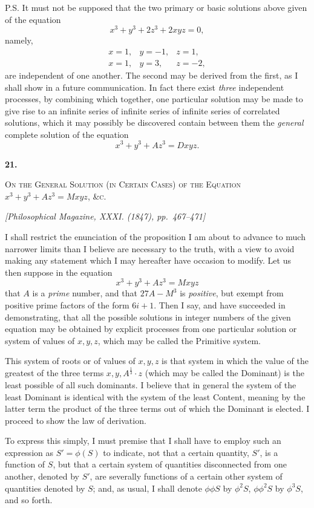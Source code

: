 \documentclass[11pt]{article}
\newcommand{\paperhead}[3]{%
  \clearpage
  \begin{center}
  {\Large\bfseries #1.}\par\vspace{0.85em}
  {\large\scshape #2}\par\vspace{0.6em}
  {\itshape [#3]}\par
  \end{center}\vspace{0.4em}}
\newcommand{\sourcepage}[1]{\marginpar{\scriptsize p.~#1}}
\begin{document}
P.S. It must not be supposed that the two primary or basic solutions above given of the equation
\[
x^3+y^3+2z^3+2xyz=0,
\]
namely,
\[
\begin{array}{rrr}
x=1,& y=-1,& z=1,\\
x=1,& y=3,& z=-2,
\end{array}
\]
are independent of one another. The second may be derived from the first, as I shall show in a future communication. In fact there exist \emph{three} independent processes, by combining which together, one particular solution may be made to give rise to an infinite series of infinite series of infinite series of correlated solutions, which it may possibly be discovered contain between them the \emph{general} complete solution of the equation
\[
x^3+y^3+Az^3=Dxyz.
\]

\paperhead{21}{On the General Solution (in Certain Cases) of the Equation $x^3+y^3+Az^3=Mxyz$, \&c.}{Philosophical Magazine, XXXI. (1847), pp.~467--471}

\sourcepage{114}
I shall restrict the enunciation of the proposition I am about to advance to much narrower limits than I believe are necessary to the truth, with a view to avoid making any statement which I may hereafter have occasion to modify. Let us then suppose in the equation
\[
x^3+y^3+Az^3=Mxyz
\]
that $A$ is a \emph{prime} number, and that $27A-M^3$ is \emph{positive}, but exempt from positive prime factors of the form $6i+1$. Then I say, and have succeeded in demonstrating, that all the possible solutions in integer numbers of the given equation may be obtained by explicit processes from one particular solution or system of values of $x,y,z$, which may be called the Primitive system.

This system of roots or of values of $x,y,z$ is that system in which the value of the greatest of the three terms $x,y,A^{\frac{1}{3}}\cdot z$ (which may be called the Dominant) is the least possible of all such dominants. I believe that in general the system of the least Dominant is identical with the system of the least Content, meaning by the latter term the product of the three terms out of which the Dominant is elected. I proceed to show the law of derivation.

To express this simply, I must premise that I shall have to employ such an expression as $S'=\phi(S)$ to indicate, not that a certain quantity, $S'$, is a function of $S$, but that a certain system of quantities disconnected from one another, denoted by $S'$, are severally functions of a certain other system of quantities denoted by $S$; and, as usual, I shall denote $\phi\phi S$ by $\phi^2S$, $\phi\phi^2S$ by $\phi^3S$, and so forth.
\end{document}
